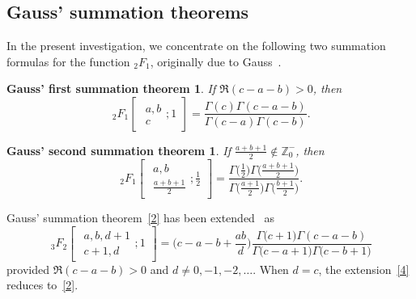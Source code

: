 \documentclass[reqno]{amsart}
\numberwithin{equation}{section}
\theoremstyle{plain}
\newtheorem*{thm1st}{Gauss' first summation theorem}
\newtheorem*{thm2nd}{Gauss' second summation theorem}
\theoremstyle{remark}
\begin{document}
\subsection{Gauss' summation theorems}
In the present investigation, we concentrate on the following two summation formulas for the function ${}_2F_1$, originally due to Gauss~\cite{7,23}.

\begin{thm1st}
If $\Re{(c-a-b)}>0$, then
\begin{equation}\label{2}
{\,}_2F_1\begin{bmatrix}
\begin{gathered}
a,b\\ c
\end{gathered};1\end{bmatrix}
=\frac{\Gamma(c)\Gamma(c-a-b)}{\Gamma(c-a)\Gamma(c-b)}.
\end{equation}
\end{thm1st}

\begin{thm2nd}
If $\frac{a+b+1}{2}\not\in\mathbb{Z}_0^-$, then
\begin{equation}\label{3}
{\,}_2F_1\begin{bmatrix}
\begin{gathered}
a,b\\ \tfrac{a+b+1}{2}\end{gathered};\frac{1}{2}\end{bmatrix}
=\frac{\Gamma\bigl(\frac{1}{2}\bigr) \Gamma\bigl(\frac{a+b+1}{2}\bigr)} {\Gamma\bigl(\frac{a+1}{2}\bigr) \Gamma\bigl(\frac{b+1}{2}\bigr)}.
\end{equation}
\end{thm2nd}

Gauss' summation theorem~\eqref{2} has been extended~\cite{22} as
\begin{equation}\label{4}
{\,}_3F_2\begin{bmatrix}
\begin{gathered}
a,b,d+1\\ c+1,d
\end{gathered};1
\end{bmatrix}
=\biggl(c-a-b+\frac{ab}{d}\biggr) \frac{\Gamma\bigl(c+1\bigr)\Gamma(c-a-b)}{\Gamma\bigl(c-a+1\bigr)\Gamma\bigl(c-b+1\bigr)}
\end{equation}
provided $\Re{(c-a-b)}>0$ and $d\neq 0,-1,-2,\dotsc$.
When $d=c$, the extension~\eqref{4} reduces to~\eqref{2}.
\end{document}
